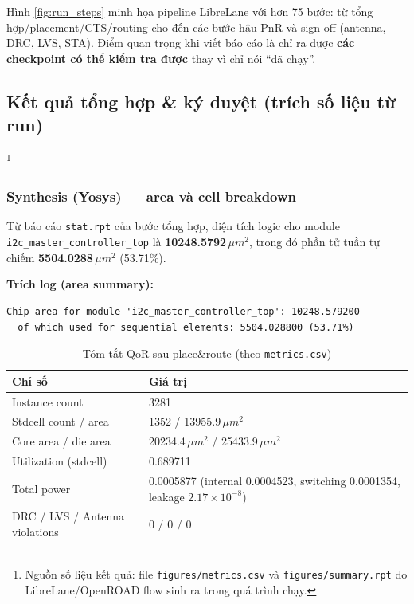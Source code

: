 Hình \ref{fig:run_steps} minh họa pipeline LibreLane với hơn 75 bước: từ tổng hợp/placement/CTS/routing cho đến các bước hậu PnR và sign-off (antenna, DRC, LVS, STA). Điểm quan trọng khi viết báo cáo là chỉ ra được \textbf{các checkpoint có thể kiểm tra được} thay vì chỉ nói ``đã chạy''.

\subsection{Kết quả tổng hợp \& ký duyệt (trích số liệu từ run)}
\footnote{Nguồn số liệu kết quả: file \texttt{figures/metrics.csv} và \texttt{figures/summary.rpt} do LibreLane/OpenROAD flow sinh ra trong quá trình chạy.}

\subsubsection{Synthesis (Yosys) --- area và cell breakdown}
Từ báo cáo \texttt{stat.rpt} của bước tổng hợp, diện tích logic cho module \texttt{i2c\_master\_controller\_top} là \textbf{10248.5792\,\(\mu m^2\)}, trong đó phần tử tuần tự chiếm \textbf{5504.0288\,\(\mu m^2\)} (53.71\%).

\textbf{Trích log (area summary):}
\begin{verbatim}
Chip area for module 'i2c_master_controller_top': 10248.579200
  of which used for sequential elements: 5504.028800 (53.71%)
\end{verbatim}

\begin{table}[H]
    \centering
    \caption{Tóm tắt QoR sau place\&route (theo \texttt{metrics.csv})}
    \label{tab:qor_metrics}
    \begin{tabularx}{\textwidth}{|l|X|}
        \hline
        \textbf{Chỉ số} & \textbf{Giá trị} \\
        \hline
        Instance count & 3281 \\
        \hline
        Stdcell count / area & 1352 / 13955.9\,\(\mu m^2\) \\
        \hline
        Core area / die area & 20234.4\,\(\mu m^2\) / 25433.9\,\(\mu m^2\) \\
        \hline
        Utilization (stdcell) & 0.689711 \\
        \hline
        Total power & 0.0005877 (internal 0.0004523, switching 0.0001354, leakage \(2.17\times 10^{-8}\)) \\
        \hline
        DRC / LVS / Antenna violations & 0 / 0 / 0 \\
        \hline
    \end{tabularx}
\end{table}

